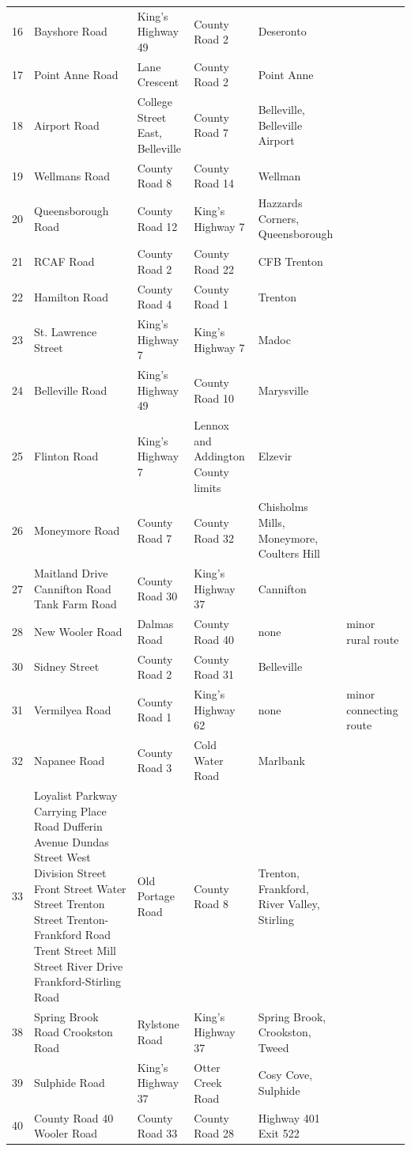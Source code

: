 \documentclass{article}
\begin{document}
\begin{tabular}{llllll}
16 & Bayshore Road & King's Highway 49 & County Road 2 & Deseronto &  \\
17 & Point Anne Road & Lane Crescent & County Road 2 & Point Anne &  \\
18 & Airport Road & College Street East, Belleville & County Road 7 & Belleville, Belleville Airport &  \\
19 & Wellmans Road & County Road 8 & County Road 14 & Wellman &  \\
20 & Queensborough Road & County Road 12 & King's Highway 7 & Hazzards Corners, Queensborough &  \\
21 & RCAF Road & County Road 2 & County Road 22 & CFB Trenton &  \\
22 & Hamilton Road & County Road 4 & County Road 1 & Trenton &  \\
23 & St. Lawrence Street & King's Highway 7 & King's Highway 7 & Madoc &  \\
24 & Belleville Road & King's Highway 49 & County Road 10 & Marysville &  \\
25 & Flinton Road & King's Highway 7 & Lennox and Addington County limits & Elzevir &  \\
26 & Moneymore Road & County Road 7 & County Road 32 & Chisholms Mills, Moneymore, Coulters Hill &  \\
27 & Maitland Drive Cannifton Road Tank Farm Road & County Road 30 & King's Highway 37 & Cannifton &  \\
28 & New Wooler Road & Dalmas Road & County Road 40 & none & minor rural route \\
30 & Sidney Street & County Road 2 & County Road 31 & Belleville &  \\
31 & Vermilyea Road & County Road 1 & King's Highway 62 & none & minor connecting route \\
32 & Napanee Road & County Road 3 & Cold Water Road & Marlbank &  \\
33 & Loyalist Parkway Carrying Place Road Dufferin Avenue Dundas Street West Division Street Front Street Water Street Trenton Street Trenton-Frankford Road Trent Street Mill Street River Drive Frankford-Stirling Road & Old Portage Road & County Road 8 & Trenton, Frankford, River Valley, Stirling &  \\
38 & Spring Brook Road Crookston Road & Rylstone Road & King's Highway 37 & Spring Brook, Crookston, Tweed &  \\
39 & Sulphide Road & King's Highway 37 & Otter Creek Road & Cosy Cove, Sulphide &  \\
40 & County Road 40 Wooler Road & County Road 33 & County Road 28 & Highway 401 Exit 522 &  \\

\end{tabular}
\end{document}
